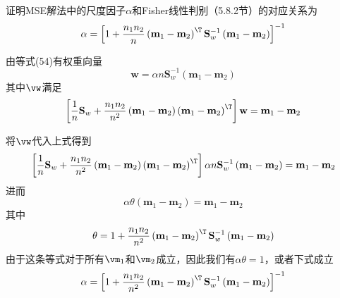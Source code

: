 \documentclass[reportComp]{thesis}
\begin{document}
\begin{question}[\textsection 5 Q21]
证明MSE解法中的尺度因子$\alpha$和Fisher线性判别（5.8.2节）的对应关系为
\[\alpha=\left[1+\frac{n_{1} n_{2}}{n}\left(\mathbf{m}_{1}-\mathbf{m}_{2}\right)^\T  \mathbf{S}_{w}^{-1}\left(\mathbf{m}_{1}-\mathbf{m}_{2}\right)\right]^{-1}\]
\end{question}
\begin{answer}
由等式(54)有权重向量
\[\mathbf{w}=\alpha n \mathbf{S}_{w}^{-1}\left(\mathbf{m}_{1}-\mathbf{m}_{2}\right)\]
其中$\vw$满足
\[\left[\frac{1}{n} \mathbf{S}_{w}+\frac{n_{1} n_{2}}{n^{2}}\left(\mathbf{m}_{1}-\mathbf{m}_{2}\right)\left(\mathbf{m}_{1}-\mathbf{m}_{2}\right)^\T \right] \mathbf{w}=\mathbf{m}_{1}-\mathbf{m}_{2}\]

将$\vw$代入上式得到
\[\left[\frac{1}{n} \mathbf{S}_{w}+\frac{n_{1} n_{2}}{n^{2}}\left(\mathbf{m}_{1}-\mathbf{m}_{2}\right)\left(\mathbf{m}_{1}-\mathbf{m}_{2}\right)^\T \right] \alpha n \mathbf{S}_{w}^{-1}\left(\mathbf{m}_{1}-\mathbf{m}_{2}\right)=\mathbf{m}_{1}-\mathbf{m}_{2}\]
进而
\[\alpha \theta\left(\mathbf{m}_{1}-\mathbf{m}_{2}\right)=\mathbf{m}_{1}-\mathbf{m}_{2}\]
其中
\[\theta=1+\frac{n_{1} n_{2}}{n^{2}}\left(\mathbf{m}_{1}-\mathbf{m}_{2}\right)^\T  \mathbf{S}_{w}^{-1}\left(\mathbf{m}_{1}-\mathbf{m}_{2}\right)\]
由于这条等式对于所有$\vm_1$和$\vm_2$成立，因此我们有$\alpha\theta=1$，或者下式成立
\[\alpha=\left[1+\frac{n_{1} n_{2}}{n^{2}}\left(\mathbf{m}_{1}-\mathbf{m}_{2}\right)^\T  \mathbf{S}_{w}^{-1}\left(\mathbf{m}_{1}-\mathbf{m}_{2}\right)\right]^{-1}\]
\end{answer}
\end{document}
